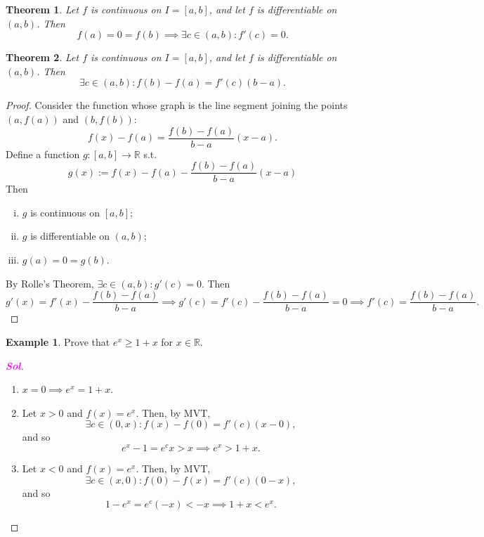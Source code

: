 \documentclass[12pt,openany]{book}
\newtheorem{theorem}{Theorem}[chapter]
\theoremstyle{definition}
\newtheorem{example}{Example}[chapter]
\newcommand{\R}{\mathbb{R}}
\newcommand{\sol}{\textcolor{magenta}{\bf Sol}}
\begin{document}
	\begin{tcolorbox}[colback=white,colframe=thmcolor,arc=5pt,title={\color{white}\bf $\star$ Rolle's Theorem}]
		\begin{theorem}
			Let $f$ is continuous on $I = [a, b]$, and let $f$ is differentiable on $(a,b)$. Then \[
			f(a)=0=f(b)\implies\exists c\in(a,b):f'(c)=0.
			\]
		\end{theorem}
	\end{tcolorbox}
	\vspace{8pt}
	\begin{tcolorbox}[colback=white,colframe=thmcolor,arc=5pt,title={\color{white}\bf $\star$ Mean Value Theorem of Differential Calculus $\star$}]
		\begin{theorem}
			Let $f$ is continuous on $I = [a, b]$, and let $f$ is differentiable on $(a,b)$. Then \[
			\exists c\in(a,b):f(b)-f(a)=f'(c)(b-a).
			\]
		\end{theorem}
	\end{tcolorbox}
	\begin{proof}
		Consider the function whose graph is the line segment joining the points \((a,f(a))\) and \((b,f(b))\): \[
		f(x)-f(a)=\frac{f(b)-f(a)}{b-a}(x-a).
		\] Define a function \(g:[a,b]\to\R\) s.t. \[
		g(x):=f(x)-f(a)-\frac{f(b)-f(a)}{b-a}(x-a)
		\] Then \begin{enumerate}[(i)]
			\item \(g\) is continuous on \([a,b]\);
			\item \(g\) is differentiable on \((a,b)\);
			\item \(g(a)=0=g(b)\). 
		\end{enumerate} By Rolle's Theorem, \(\exists c\in(a,b):g'(c)=0\). Then \[
		g'(x)=f'(x)-\frac{f(b)-f(a)}{b-a}\implies g'(c)=f'(c)-\frac{f(b)-f(a)}{b-a}=0\implies
		f'(c)=\frac{f(b)-f(a)}{b-a}.
		\]
	\end{proof}
	\vspace{8pt}
	\begin{example}
		Prove that $e^x\geq 1+x$ for $x\in\R$.
		\begin{proof}[\sol]
			\begin{enumerate}[(1)]
				\item \(x=0\implies e^x=1+x\).
				\item Let \(x>0\) and \(f(x)=e^x\). Then, by MVT, \[
				\exists c\in(0,x):f(x)-f(0)=f'(c)(x-0),
				\] and so \[
				e^x-1=e^cx> x\implies e^x>1+x.
				\]
				\item Let $x<0$ and $f(x)=e^x$. Then, by MVT, \[
				\exists c\in(x,0): f(0)-f(x)=f'(c)(0-x),
				\] and so \[
				1-e^x=e^c(-x)< -x\implies 1+x<e^x.
				\]
			\end{enumerate}
		\end{proof}
	\end{example}
	
\end{document}
